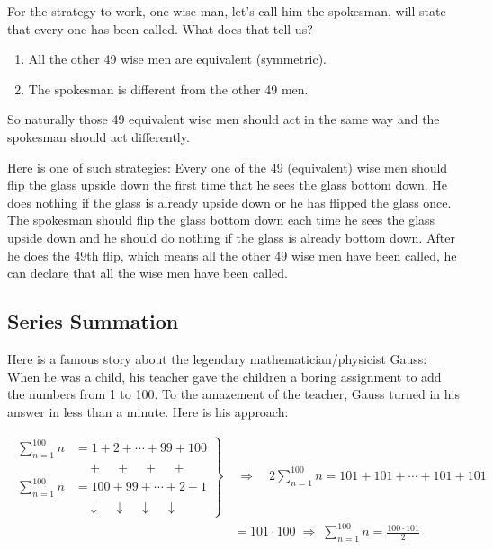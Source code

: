 \begin{solution}

For the strategy to work, one wise man, let's call him the spokesman, will state that
every one has been called. What does that tell us?

\begin{enumerate}
\item All the other 49 wise men are equivalent (symmetric).
\item The spokesman is different from the other 49 men.
\end{enumerate}

So naturally those 49 equivalent wise men should act in the same way and the spokesman
should act differently.

Here is one of such strategies: Every one of the 49 (equivalent) wise men should flip the
glass upside down the first time that he sees the glass bottom down. He does nothing if
the glass is already upside down or he has flipped the glass once. The spokesman should
flip the glass bottom down each time he sees the glass upside down and he should do
nothing if the glass is already bottom down. After he does the 49th flip, which means all
the other 49 wise men have been called, he can declare that all the wise men have been
called.
\end{solution}

\subsection{Series Summation}

Here is a famous story about the legendary mathematician/physicist Gauss: When he was
a child, his teacher gave the children a boring assignment to add the numbers from 1 to
100. To the amazement of the teacher, Gauss turned in his answer in less than a minute.
Here is his approach:

\[
\begin{aligned}
\left.\begin{aligned}
\sum_{n=1}^{100} n &= 1+2+\cdots+99+100\\
&\quad {}+{}\quad {}+{}\quad {}+{}\quad {}+{}\\
\sum_{n=1}^{100} n &= 100+99+\cdots+2+1\\
&\quad \downarrow\quad\downarrow\quad\downarrow\quad\downarrow
\end{aligned}\right\}
&\;\Rightarrow\quad
2\sum_{n=1}^{100} n = 101+101+\cdots+101+101\\
&=101\cdot100
\;\Rightarrow\;
\sum_{n=1}^{100} n=\frac{100\cdot101}{2}
\end{aligned}
\]
